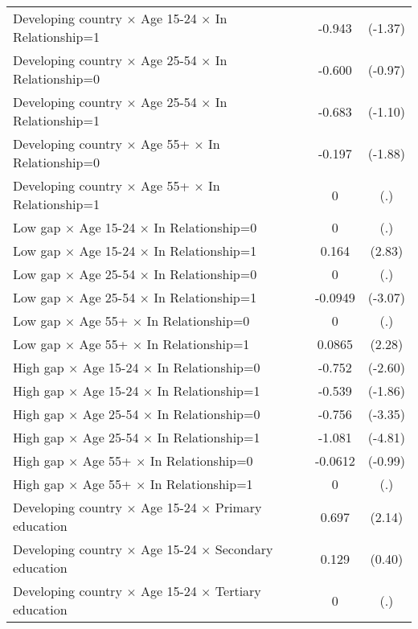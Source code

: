 {\begin{longtable}{l*{1}{cc}}
Developing country $\times$ Age 15-24 $\times$ In Relationship=1&      -0.943         &     (-1.37)\\
Developing country $\times$ Age 25-54 $\times$ In Relationship=0&      -0.600         &     (-0.97)\\
Developing country $\times$ Age 25-54 $\times$ In Relationship=1&      -0.683         &     (-1.10)\\
Developing country $\times$ Age 55+ $\times$ In Relationship=0&      -0.197         &     (-1.88)\\
Developing country $\times$ Age 55+ $\times$ In Relationship=1&           0         &         (.)\\
Low gap $\times$ Age 15-24 $\times$ In Relationship=0&           0         &         (.)\\
Low gap $\times$ Age 15-24 $\times$ In Relationship=1&       0.164\sym{**} &      (2.83)\\
Low gap $\times$ Age 25-54 $\times$ In Relationship=0&           0         &         (.)\\
Low gap $\times$ Age 25-54 $\times$ In Relationship=1&     -0.0949\sym{**} &     (-3.07)\\
Low gap $\times$ Age 55+ $\times$ In Relationship=0&           0         &         (.)\\
Low gap $\times$ Age 55+ $\times$ In Relationship=1&      0.0865\sym{*}  &      (2.28)\\
High gap $\times$ Age 15-24 $\times$ In Relationship=0&      -0.752\sym{**} &     (-2.60)\\
High gap $\times$ Age 15-24 $\times$ In Relationship=1&      -0.539         &     (-1.86)\\
High gap $\times$ Age 25-54 $\times$ In Relationship=0&      -0.756\sym{***}&     (-3.35)\\
High gap $\times$ Age 25-54 $\times$ In Relationship=1&      -1.081\sym{***}&     (-4.81)\\
High gap $\times$ Age 55+ $\times$ In Relationship=0&     -0.0612         &     (-0.99)\\
High gap $\times$ Age 55+ $\times$ In Relationship=1&           0         &         (.)\\
Developing country $\times$ Age 15-24 $\times$ Primary education&       0.697\sym{*}  &      (2.14)\\
Developing country $\times$ Age 15-24 $\times$ Secondary education&       0.129         &      (0.40)\\
Developing country $\times$ Age 15-24 $\times$ Tertiary education&           0         &         (.)\\

\end{longtable}}
